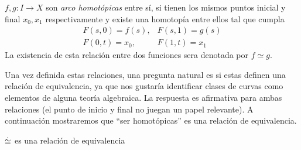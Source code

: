 \begin{definicion}
  \(f,g : I \to X\) son \emph{arco homotópicas} entre sí, si tienen los mismos
  puntos inicial y final \(x_0, x_1\) respectivamente y existe una homotopía entre
  ellos tal que cumpla
  \[
    \begin{matrix}
      F(s,0) = f(s), & F(s,1) = g(s) \\
      F(0,t) = x_0,  & F(1,t) = x_1
    \end{matrix}
  \]
  La existencia de esta relación entre dos funciones sera denotada por
  \(f \simeq g\).
\end{definicion}
Una vez definida estas relaciones, una pregunta natural es si estas definen
una relación de equivalencia, ya que nos gustaría identificar clases de
curvas como elementos de alguna teoría algebraica. La respuesta es
afirmativa para ambas relaciones (el punto de inicio y final no juegan
un papel relevante). A continuación mostraremos que ``ser homotópicas''
es una relación de equivalencia.
\begin{teorema}
  \(\stackrel{.}{\simeq}\) es una relación de equivalencia
\end{teorema}
